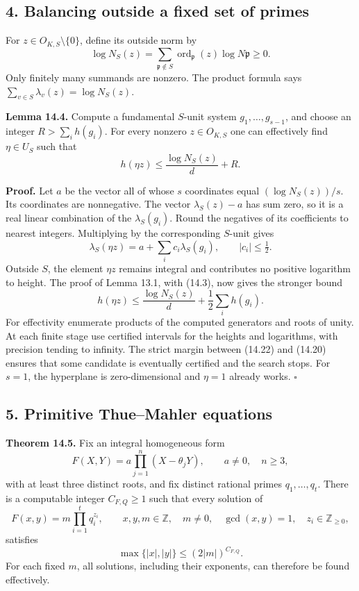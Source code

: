 \documentclass[
  11pt,
  a4paper,
]{article}
\begin{document}
\subsection{4. Balancing outside a fixed set of
primes}\label{balancing-outside-a-fixed-set-of-primes}

For \(z\in O_{K,S}\setminus\{0\}\), define its outside norm by \[
\log N_S(z)=
\sum_{\mathfrak p\notin S}
\operatorname{ord}_{\mathfrak p}(z)\log N\mathfrak p\ge0.
\tag{14.19}
\] Only finitely many summands are nonzero. The product formula says
\(\sum_{v\in S}\lambda_v(z)=\log N_S(z)\).

\textbf{Lemma 14.4.} Compute a fundamental \(S\)-unit system
\(g_1,\ldots,g_{s-1}\), and choose an integer \(R>\sum_i h(g_i)\). For
every nonzero \(z\in O_{K,S}\) one can effectively find \(\eta\in U_S\)
such that \[
h(\eta z)\le \frac{\log N_S(z)}d+R .
\tag{14.20}
\]

\textbf{Proof.} Let \(a\) be the vector all of whose \(s\) coordinates
equal \((\log N_S(z))/s\). Its coordinates are nonnegative. The vector
\(\lambda_S(z)-a\) has sum zero, so it is a real linear combination of
the \(\lambda_S(g_i)\). Round the negatives of its coefficients to
nearest integers. Multiplying by the corresponding \(S\)-unit gives \[
\lambda_S(\eta z)=a+\sum_i c_i\lambda_S(g_i),
\qquad |c_i|\le\tfrac12.
\tag{14.21}
\] Outside \(S\), the element \(\eta z\) remains integral and
contributes no positive logarithm to height. The proof of Lemma 13.1,
with (14.3), now gives the stronger bound \[
h(\eta z)\le\frac{\log N_S(z)}d
                    +\frac12\sum_i h(g_i).
\tag{14.22}
\] For effectivity enumerate products of the computed generators and
roots of unity. At each finite stage use certified intervals for the
heights and logarithms, with precision tending to infinity. The strict
margin between (14.22) and (14.20) ensures that some candidate is
eventually certified and the search stops. For \(s=1\), the hyperplane
is zero-dimensional and \(\eta=1\) already works. \(\square\)

\subsection{5. Primitive Thue--Mahler
equations}\label{primitive-thuemahler-equations}

\textbf{Theorem 14.5.} Fix an integral homogeneous form \[
F(X,Y)=a\prod_{j=1}^n(X-\theta_jY),\qquad a\ne0,\quad n\ge3,
\tag{14.23}
\] with at least three distinct roots, and fix distinct rational primes
\(q_1,\ldots,q_t\). There is a computable integer \(C_{F,Q}\ge1\) such
that every solution of \[
F(x,y)=m\prod_{i=1}^tq_i^{z_i},\qquad
x,y,m\in\mathbb Z,\quad m\ne0,\quad
\gcd(x,y)=1,\quad z_i\in\mathbb Z_{\ge0},
\tag{14.24}
\] satisfies \[
\max\{|x|,|y|\}\le(2|m|)^{C_{F,Q}}.
\tag{14.25}
\] For each fixed \(m\), all solutions, including their exponents, can
therefore be found effectively.
\end{document}

